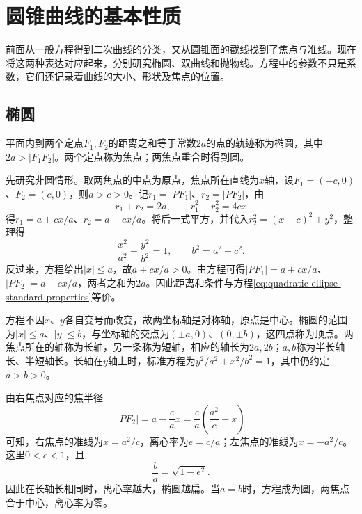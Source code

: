 \newpage
\section{圆锥曲线的基本性质}
\label{sec:quadratic-conic-properties}

前面从一般方程得到二次曲线的分类，又从圆锥面的截线找到了焦点与准线。现在将这两种表达对应起来，分别研究椭圆、双曲线和抛物线。方程中的参数不只是系数，它们还记录着曲线的大小、形状及焦点的位置。

\subsection{椭圆}
\label{subsec:quadratic-ellipse}

\begin{definition}
平面内到两个定点\(F_1,F_2\)的距离之和等于常数\(2a\)的点的轨迹称为{\heiti{}椭圆}，其中\(2a>|F_1F_2|\)。两个定点称为焦点；两焦点重合时得到圆。
\end{definition}

先研究非圆情形。取两焦点的中点为原点，焦点所在直线为\(x\)轴，设\(F_1=(-c,0)\)、\(F_2=(c,0)\)，则\(a>c>0\)。记\(r_1=|PF_1|\)、\(r_2=|PF_2|\)，由
\begin{equation*}
    r_1+r_2=2a ,\qquad r_1^2-r_2^2=4cx
\end{equation*}
得\(r_1=a+cx/a\)、\(r_2=a-cx/a\)。将后一式平方，并代入\(r_2^2=(x-c)^2+y^2\)，整理得
\begin{equation}\label{eq:quadratic-ellipse-standard-properties}
    \frac{x^2}{a^2}+\frac{y^2}{b^2}=1 ,\qquad b^2=a^2-c^2 .
\end{equation}
反过来，方程给出\(|x|\le a\)，故\(a\pm cx/a>0\)。由方程可得\(|PF_1|=a+cx/a\)、\(|PF_2|=a-cx/a\)，两者之和为\(2a\)。因此距离和条件与方程\eqref{eq:quadratic-ellipse-standard-properties}等价。

方程不因\(x\)、\(y\)各自变号而改变，故两坐标轴是对称轴，原点是中心。椭圆的范围为\(|x|\le a\)、\(|y|\le b\)，与坐标轴的交点为\((\pm a,0)\)、\((0,\pm b)\)，这四点称为{\heiti{}顶点}。两焦点所在的轴称为长轴，另一条称为短轴，相应的轴长为\(2a,2b\)；\(a,b\)称为半长轴长、半短轴长。长轴在\(y\)轴上时，标准方程为\(y^2/a^2+x^2/b^2=1\)，其中仍约定\(a>b>0\)。

由右焦点对应的焦半径
\begin{equation}\label{eq:quadratic-ellipse-focal-radius}
    |PF_2|=a-\frac ca x
        =\frac ca\left(\frac{a^2}{c}-x\right)
\end{equation}
可知，右焦点的准线为\(x=a^2/c\)，离心率为\(e=c/a\)；左焦点的准线为\(x=-a^2/c\)。这里\(0<e<1\)，且
\begin{equation}\label{eq:quadratic-ellipse-shape}
    \frac ba=\sqrt{1-e^2} .
\end{equation}
因此在长轴长相同时，离心率越大，椭圆越扁。当\(a=b\)时，方程成为圆，两焦点合于中心，离心率为零。

